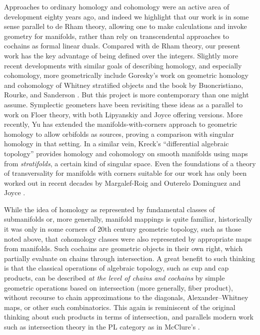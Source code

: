 Approaches to ordinary homology and cohomology were an active area of development eighty years ago, and indeed we highlight that our work is in some sense parallel to de Rham theory, allowing one to make calculations and invoke geometry for manifolds, rather than rely on transcendental approaches to cochains as formal linear duals.
Compared with de Rham theory, our present work has the key advantage of being defined over the integers.
Slightly more recent developments with similar goals of describing homology, and especially cohomology, more geometrically include Goresky's work on geometric homology and cohomology of Whitney stratified objects \cite{goresky1981stratified} and the book by Buoncristiano, Rourke, and Sanderson \cite{buoncristiano1976homology}.
But this project is more contemporary than one might assume.
Symplectic geometers have been revisiting these ideas as a parallel to work on Floer theory, with both Lipyanskiy \cite{Lipy14} and Joyce \cite{Joyc15} offering versions.
More recently, Yu \cite{Yu26} has extended the manifolds-with-corners approach to geometric homology to allow orbifolds as sources, proving a comparison with singular homology in that setting.
In a similar vein, Kreck's ``differential algebraic topology'' \cite{Krec10} provides homology and cohomology on smooth manifolds using maps from \textit{stratifolds}, a certain kind of singular space.
Even the foundations of a theory of transversality for manifolds with corners suitable for our work has only been worked out in recent decades by Margalef-Roig and Outerelo Dominguez \cite{MaDo92} and Joyce \cite{Joy12}.

While the idea of homology as represented by fundamental classes of submanifolds or, more generally, manifold mappings is quite familiar, historically it was only in some corners of 20th century geometric topology, such as those noted above, that \textit{co}homology classes were also represented by appropriate maps from manifolds.
Such cochains are geometric objects in their own right, which partially evaluate on chains through intersection.
A great benefit to such thinking is that the classical operations of algebraic topology, such as cup and cap products, can be described \textit{at the level of chains and cochains} by simple geometric operations based on intersection (more generally, fiber product), without recourse to chain approximations to the diagonals, Alexander--Whitney maps, or other such combinatorics.
This again is reminiscent of the original thinking about such products in terms of intersection, and parallels modern work such as intersection theory in the PL category as in McClure's \cite{McC06}.

